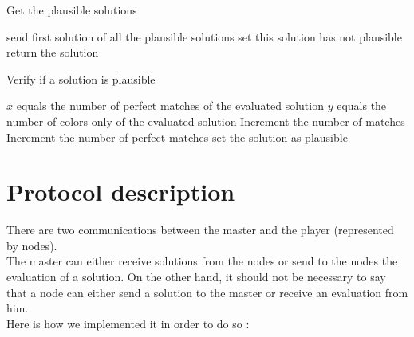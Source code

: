 \documentclass{article}
\begin{document}
\begin{algorithm}[H] 
  \caption{Get the plausible solutions} 
  \begin{algorithmic}[1]
  \State send first solution of all the plausible solutions
  \EndIf
  \State set this solution has not plausible
   \EndIf
  \EndFor
  \State return the solution
  \EndIf
  \EndFor
  \EndProcedure
  \end{algorithmic}
\end{algorithm}


\begin{algorithm}[H] 
  \caption{Verify if a solution is plausible} 
  \begin{algorithmic}[1]
 \State $x$ equals the number of perfect matches of the evaluated solution
  \State $y$ equals the number of colors only of the evaluated solution
  \State Increment the number of matches
  \EndIf
  \State Increment the number of perfect matches
  \EndIf
  \EndFor
  \EndFor
  \State set the solution as plausible
  \EndIf
  \EndProcedure
  \end{algorithmic}
\end{algorithm}




\section{Protocol description}

There are two communications between the master and the player (represented by nodes). \\
The master can either receive solutions from the nodes or send to the nodes the evaluation of a solution. On the other hand, it should not be necessary to say that a node can either send a solution to the master or receive an evaluation from him.\\
Here is how we implemented it in order to do so : 
\end{document}

